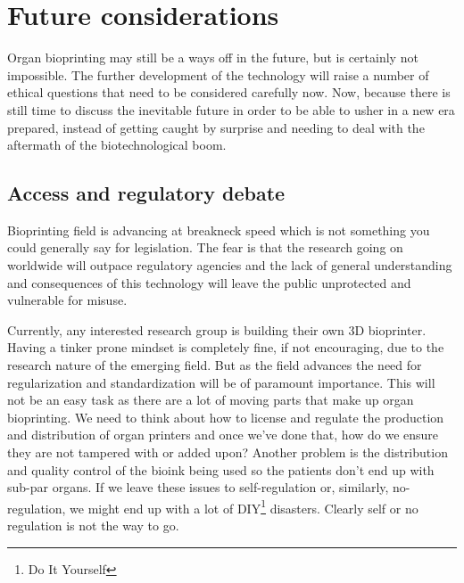 \documentclass[12pt]{article} %
\begin{document}
\newpage 


\section{Future considerations} %

Organ bioprinting may still be a ways off in the future, but is certainly not impossible. The further development of the technology will raise a number of ethical questions that need to be considered carefully now. Now, because there is still time to discuss the inevitable future in order to be able to usher in a new era prepared, instead of getting caught by surprise and needing to deal with the aftermath of the biotechnological boom. 


\subsection{Access and regulatory debate} %

Bioprinting field is advancing at breakneck speed which is not something you could generally say for legislation. The fear is that the research going on worldwide will outpace regulatory agencies and the lack of general understanding and consequences of this technology will leave the public unprotected and vulnerable for misuse. 

Currently, any interested research group is building their own 3D bioprinter. Having a tinker prone mindset is completely fine, if not encouraging, due to the research nature of the emerging field. But as the field advances the need for regularization and standardization will be of paramount importance. This will not be an easy task as there are a lot of moving parts that make up organ bioprinting. We need to think about how to license and regulate the production and distribution of organ printers and once we've done that, how do we ensure they are not tampered with or added upon? 
Another problem is the distribution and quality control of the bioink being used so the patients don't end up with sub-par organs. If we leave these issues to self-regulation or, similarly, no-regulation, we might end up with a lot of DIY\footnote{Do It Yourself} disasters. Clearly self or no regulation is not the way to go.
\end{document}
